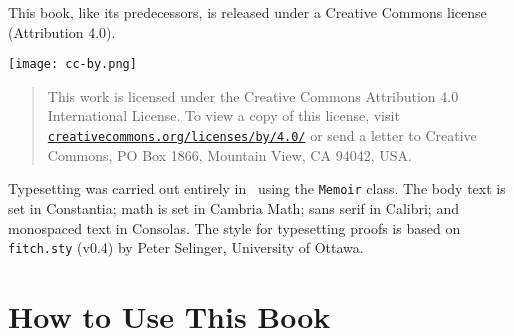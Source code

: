 This book, like its predecessors, is released under a Creative Commons license (Attribution 4.0).\medskip 

\begin{center}
	\texttt{[image: cc-by.png]} 
\end{center}

\begin{quote}
	{\small This work is licensed under the Creative Commons Attribution 4.0 International License. To view a copy of this license, visit \href{https://creativecommons.org/licenses/by/4.0/}{\nolinkurl{creativecommons.org/licenses/by/4.0/}} or send a letter to Creative Commons, PO Box 1866, Mountain View, CA 94042, USA.} 
\end{quote} \medskip


\vfill

Typesetting was carried out entirely in \XeLaTeX\ using the \texttt{Memoir} class. The body text is set in Constantia; math is set in Cambria Math; sans serif in Calibri; and monospaced text in Consolas. The style for typesetting proofs is based on \texttt{fitch.sty} (v0.4) by Peter Selinger, University of Ottawa.

\newpage
\tableofcontents*\newpage
\listoffigures*

\chapter*{How to Use This Book}

